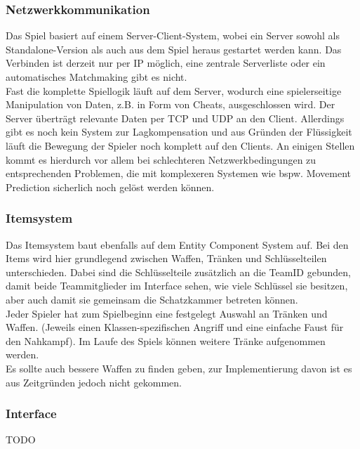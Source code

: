\documentclass[10pt,a4paper,notitlepage]{scrreprt}
\begin{document}
		\subsubsection{Netzwerkkommunikation}
		
		Das Spiel basiert auf einem Server-Client-System, wobei ein Server sowohl als Standalone-Version als auch aus dem Spiel heraus gestartet werden kann. Das Verbinden ist derzeit nur per IP möglich, eine zentrale Serverliste oder ein automatisches Matchmaking gibt es nicht.\\
		Fast die komplette Spiellogik läuft auf dem Server, wodurch eine spielerseitige Manipulation von Daten, z.B. in Form von Cheats, ausgeschlossen wird. Der Server überträgt relevante Daten per TCP und UDP an den Client. Allerdings gibt es noch kein System zur Lagkompensation und aus Gründen der Flüssigkeit läuft die Bewegung der Spieler noch komplett auf den Clients. An einigen Stellen kommt es hierdurch vor allem bei schlechteren Netzwerkbedingungen zu entsprechenden Problemen, die mit komplexeren Systemen wie bspw. Movement Prediction sicherlich noch gelöst werden können.\\
		
		\subsubsection{Itemsystem}
		
		Das Itemsystem baut ebenfalls auf dem Entity Component System auf. Bei den Items wird hier grundlegend zwischen Waffen, Tränken und Schlüsselteilen unterschieden. Dabei sind die Schlüsselteile zusätzlich an die TeamID gebunden, damit beide Teammitglieder im Interface sehen, wie viele Schlüssel sie besitzen, aber auch damit sie gemeinsam die Schatzkammer betreten können.\\
		Jeder Spieler hat zum Spielbeginn eine festgelegt Auswahl an Tränken und Waffen. (Jeweils einen Klassen-spezifischen Angriff und eine einfache Faust für den Nahkampf). Im Laufe des Spiels können weitere Tränke aufgenommen werden.\\
		Es sollte auch bessere Waffen zu finden geben, zur Implementierung davon ist es aus Zeitgründen jedoch nicht gekommen.\\
		
		\subsubsection{Interface}
		
		TODO
\end{document}

